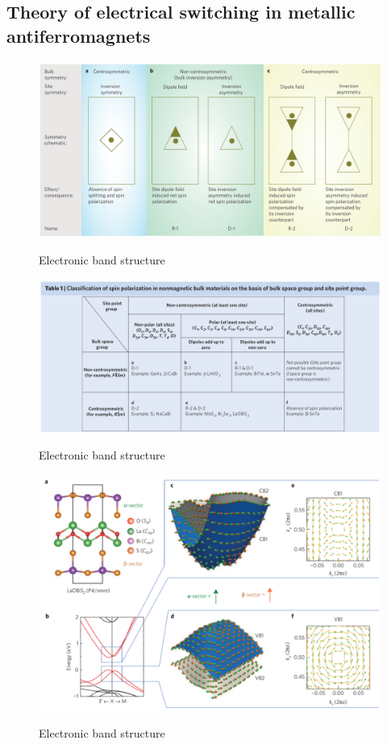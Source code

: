 \documentclass[11pt,edeposit,draftthesis]{uiucthesis2020}
\begin{document}
\begin{mainmatter}
\chapter{Theory of electrical switching in metallic antiferromagnets}

\begin{figure}
\centering\includegraphics[width=\columnwidth]{figures/ch2/zhang_1.png} \\
\caption{\label{fig:zhang_1}
Electronic band structure
}
\end{figure}

\begin{figure}
\centering\includegraphics[width=\columnwidth]{figures/ch2/zhang_2.png} \\
\caption{\label{fig:zhang_2}
Electronic band structure
}
\end{figure}

\begin{figure}
\centering\includegraphics[width=\columnwidth]{figures/ch2/zhang_3.png} \\
\caption{\label{fig:zhang_3}
Electronic band structure
}
\end{figure}


\end{mainmatter}
\end{document}
